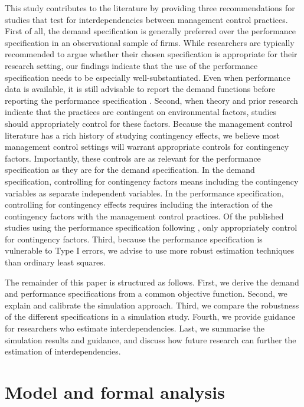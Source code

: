\documentclass[12pt]{article}
\begin{document}
This study contributes to the literature by providing three recommendations for studies that test for interdependencies between management control practices. First of all, the demand specification is generally preferred over the performance specification in an observational sample of firms. While researchers are typically recommended to argue whether their chosen specification is appropriate for their research setting, our findings indicate that the use of the performance specification needs to be especially well-substantiated. Even when performance data is available, it is still advisable to report the demand functions before reporting the performance specification \citep{aral_three-way_2012, cassiman_search_2006}. Second, when theory and prior research indicate that the practices are contingent on environmental factors, studies should appropriately control for these factors. Because the management control literature has a rich history of studying contingency effects, we believe most management control settings will warrant appropriate controls for contingency factors. Importantly, these controls are as relevant for the performance specification as they are for the demand specification. In the demand specification, controlling for contingency factors means including the contingency variables as separate independent variables. In the performance specification, controlling for contingency effects requires including the interaction of the contingency factors with the management control practices. Of the published studies using the performance specification following \citet{grabner_management_2013}, only \citet{bedford_management_2016, bedford_performance_2019} appropriately control for contingency factors. Third, because the performance specification is vulnerable to Type I errors, we advise to use more robust estimation techniques than ordinary least squares.

The remainder of this paper is structured as follows. First, we derive the demand and performance specifications from a common objective function. Second, we explain and calibrate the simulation approach. Third, we compare the robustness of the different specifications in a simulation study. Fourth, we provide guidance for researchers who estimate interdependencies. Last, we summarise the simulation results and guidance, and discuss how future research can further the estimation of interdependencies.

\section{Model and formal analysis}\label{model-and-formal-analysis}
\end{document}
